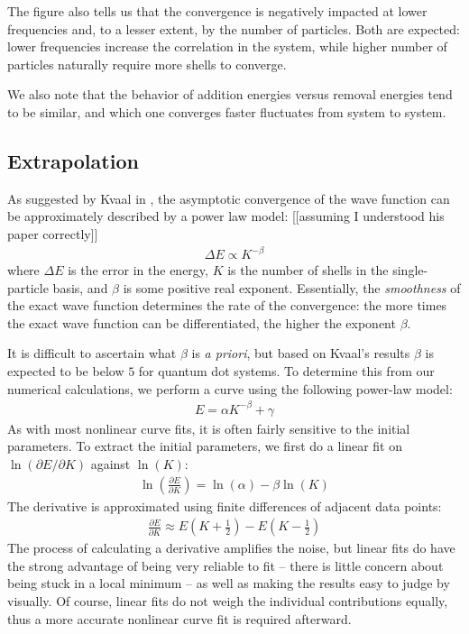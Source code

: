 The figure also tells us that the convergence is negatively impacted at lower frequencies and, to a lesser extent, by the number of particles.  Both are expected: lower frequencies increase the correlation in the system, while higher number of particles naturally require more shells to converge.

We also note that the behavior of addition energies versus removal energies tend to be similar, and which one converges faster fluctuates from system to system.

\subsection{Extrapolation}

As suggested by Kvaal in \cite{PhysRevB.80.045321}, the asymptotic convergence of the wave function can be approximately described by a power law model: [[assuming I understood his paper correctly]]
\begin{align*}
  \Delta E \propto K^{-\beta}
\end{align*}
where $\Delta E$ is the error in the energy, $K$ is the number of shells in the single-particle basis, and $\beta$ is some positive real exponent.  Essentially, the \textit{smoothness} of the exact wave function determines the rate of the convergence: the more times the exact wave function can be differentiated, the higher the exponent $\beta$.

It is difficult to ascertain what $\beta$ is \textit{a priori}, but based on Kvaal's results $\beta$ is expected to be below $5$ for quantum dot systems.  To determine this from our numerical calculations, we perform a curve using the following power-law model:
\begin{align} \label{eq:power_law_model}
  E = \alpha K^{-\beta} + \gamma
\end{align}
As with most nonlinear curve fits, it is often fairly sensitive to the initial parameters.  To extract the initial parameters, we first do a linear fit on $\ln (\partial E / \partial K)$ against $\ln (K)$:
\begin{align*}
  \ln \left(\frac{\partial E}{\partial K}\right) = \ln(\alpha) - \beta \ln(K)
\end{align*}
The derivative is approximated using finite differences of adjacent data points:
\begin{align*}
  \frac{\partial E}{\partial K} \approx E\left(K + \frac{1}{2}\right) - E\left(K - \frac{1}{2}\right)
\end{align*}
The process of calculating a derivative amplifies the noise, but linear fits do have the strong advantage of being very reliable to fit -- there is little concern about being stuck in a local minimum -- as well as making the results easy to judge by visually.  Of course, linear fits do not weigh the individual contributions equally, thus a more accurate nonlinear curve fit is required afterward.

